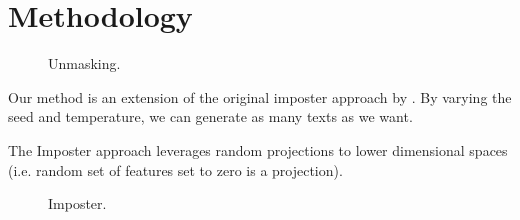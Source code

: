 \chapter{Methodology}
\label{chap:methodology}








\begin{figure}[htbp]
    \centering
    
    \caption{Unmasking.}
    \label{fig:unmasking}
\end{figure}
Our method is an extension of the original imposter approach by \citet{koppel_determining_2014}.
By varying the seed and temperature, we can generate as many texts as we want.
  
    
The Imposter approach leverages random projections to lower dimensional spaces (i.e. random set of features set to zero is a projection).
\begin{figure}[htbp]
    \centering
    
    \caption{Imposter.}
    \label{fig:imposter}
\end{figure}
